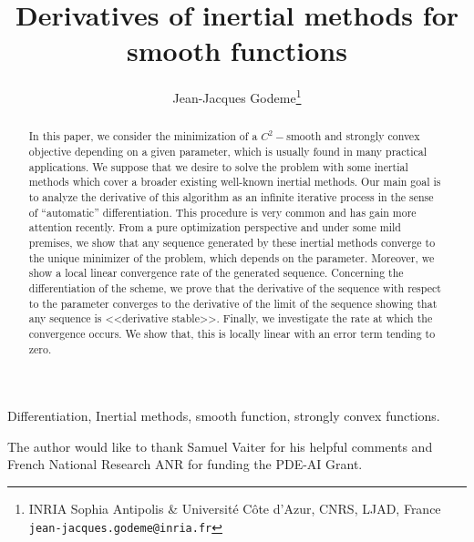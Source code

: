 \documentclass[11pt,reqno,twoside,a4paper]{article}
\title{Derivatives of inertial methods for smooth functions}
\author{Jean-Jacques Godeme\thanks{ INRIA Sophia Antipolis  \& Universit\'e C\^ote d’Azur, CNRS, LJAD, France \texttt{jean-jacques.godeme@inria.fr}} }
\date{}
\begin{document}
\maketitle


\begin{abstract}
In this paper, we consider the minimization of a $C^2-$smooth  and strongly  convex objective depending on a given parameter, which is usually found in many practical applications. We suppose that we desire to solve the problem with some  inertial methods which cover a broader existing well-known inertial methods. Our main goal is to analyze  the derivative of this algorithm as an infinite iterative process in  the sense of ``automatic'' differentiation. This procedure is  very common and has gain more attention recently. From a pure optimization perspective and under some mild premises, we show that  any sequence generated by these inertial methods converge to the unique minimizer of the problem, which depends on the parameter. Moreover,  we show a local linear convergence rate of the generated sequence. Concerning the differentiation of the scheme, we prove that  the derivative of the sequence with respect to the parameter converges to the derivative of the limit of the sequence showing that any sequence is <<derivative stable>>. Finally, we investigate  the rate at  which the convergence occurs. We show that, this is locally linear with an error term tending to zero. 
\end{abstract}

\begin{keywords} Differentiation,  Inertial methods, smooth function,  strongly convex functions.
\end{keywords}







\begin{acknowledgments}
The  author would like to thank Samuel Vaiter for his helpful comments and French National Research  ANR for funding the PDE-AI Grant.
\end{acknowledgments}


{

}
\end{document}
